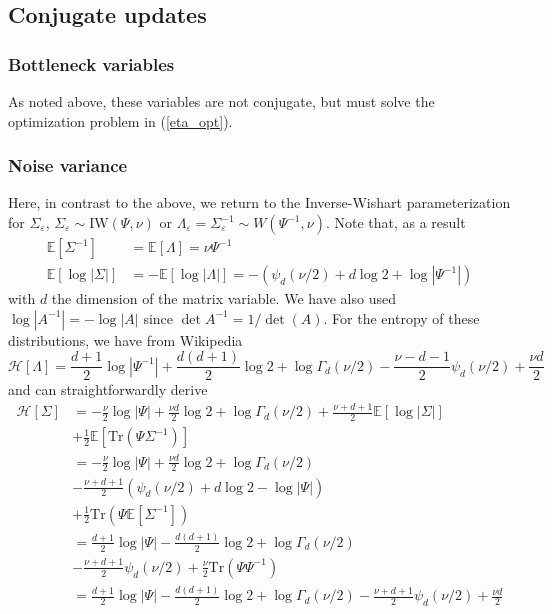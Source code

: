 \documentclass[11pt]{article}
\begin{document}
\subsection{Conjugate updates}
\subsubsection{Bottleneck variables}
As noted above, these variables are not conjugate, but must solve the optimization problem in (\ref{eta_opt}).
\subsubsection{Noise variance}
Here, in contrast to the above, we return to the Inverse-Wishart parameterization for $\Sigma_\varepsilon$, $\Sigma_\varepsilon \sim \mathrm{IW}(\Psi, \nu)$ or $\Lambda_\varepsilon = \Sigma^{-1}_\varepsilon \sim W(\Psi^{-1}, \nu)$. Note that, as a result
\begin{align}
    \mathbb{E}[\Sigma^{-1}] &= \mathbb{E}[\Lambda] = \nu \Psi^{-1} \\
    \mathbb{E}[\log |\Sigma|] &= -\mathbb{E}[\log |\Lambda|] = -(\psi_d(\nu/2) + d \log 2 + \log |\Psi^{-1}|)
\end{align}
with $d$ the dimension of the matrix variable. We have also used $\log |A^{-1}| = -\log |A|$ since $\det A^{-1} = 1/\det(A)$. For the entropy of these distributions, we have from Wikipedia
\begin{equation}
    \mathcal{H}[\Lambda] = \frac{d + 1}{2}\log |\Psi^{-1}| + \frac{d(d+1)}{2} \log 2
    + \log \Gamma_d(\nu/2) - \frac{\nu - d - 1}{2} \psi_d(\nu/2) + \frac{\nu d}{2}
\end{equation}
and can straightforwardly derive
\begin{align}
    \mathcal{H}[\Sigma] &= -\frac{\nu}{2}\log |\Psi| + \frac{\nu d}{2} \log 2
    + \log \Gamma_d(\nu/2) + \frac{\nu + d + 1}{2} \mathbb{E}[\log |\Sigma|] \\
    &+ \frac{1}{2} \mathbb{E}[\mathrm{Tr}\left(\Psi \Sigma^{-1} \right)] \\
    &= -\frac{\nu}{2}\log |\Psi| + \frac{\nu d}{2} \log 2
    + \log \Gamma_d(\nu/2) \\
    &- \frac{\nu + d + 1}{2}\left(\psi_d(\nu/2) + d \log 2 - \log |\Psi|\right) \\
    &+ \frac{1}{2}\mathrm{Tr}\left(\Psi \mathbb{E}[\Sigma^{-1}] \right) \\
    &= \frac{d + 1}{2}\log |\Psi| - \frac{d(d + 1)}{2} \log 2 + \log \Gamma_d(\nu/2) \\
    &- \frac{\nu + d + 1}{2}\psi_d(\nu/2)
    + \frac{\nu}{2} \mathrm{Tr}\left(\Psi \Psi^{-1} \right) \\
    &=\frac{d + 1}{2}\log |\Psi| - \frac{d(d + 1)}{2} \log 2 + \log \Gamma_d(\nu/2) - \frac{\nu + d + 1}{2}\psi_d(\nu/2)
    + \frac{\nu d}{2}
\end{align}
\end{document}
